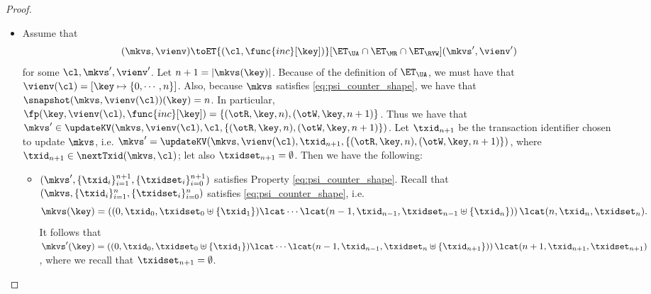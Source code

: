 \begin{proof}
\begin{itemize}
\item 
Assume that
\[
(\mkvs, \vienv) \toET{(\cl, \func{inc}[\key])}[\ET_{\UA} \cap \ET_{\MR} \cap  \ET_{\RYW}] (\mkvs', \vienv')
\]
for some $\cl, \mkvs', \vienv'$. Let $n+1 = \lvert \mkvs(\key) \rvert$. Because of the definition of 
$\ET_{\UA}$, we must have that $\vienv(\cl) = [\key \mapsto \{0, \cdots, n\}]$. Also, 
because $\mkvs$ satisfies \eqref{eq:psi_counter_shape}, we have that $\snapshot(\mkvs, \vienv(\cl))(\key) = n$. 
In particular, $\fp(\key, \vienv(\cl), \func{inc}[\key]) = \{(\otR, \key, n), (\otW, \key, n+1)\}$. 
Thus we have that $\mkvs' \in \updateKV(\mkvs, \vienv(\cl), \cl, \{(\otR, \key, n), (\otW, \key, n+1)\})$. 
Let $\txid_{n+1}$ be the transaction identifier 
chosen to update $\mkvs$, i.e. $\mkvs' = \updateKV(\mkvs, \vienv(\cl), \txid_{n+1}, \{(\otR, \key, n), (\otW, \key, n+1)\})$, 
where $\txid_{n+1} \in \nextTxid(\mkvs, \cl)$; 
let also $\txidset_{n+1} = \emptyset$. Then we have the following: 
\begin{itemize}
\item  $(\mkvs', \{\txid_{i}\}_{i=1}^{n+1}, \{\txidset_{i}\}_{i=0}^{n+1})$ satisfies Property \eqref{eq:psi_counter_shape}. 
Recall that $(\mkvs, \{\txid_{i}\}_{i=1}^{n}, \{\txidset_{i}\}_{i=0}^{n})$ satisfies \eqref{eq:psi_counter_shape}, 
i.e.
\[\mkvs(\key) = \left( (0, \txid_{0}, \txidset_{0} \uplus \{\txid_1\}) \lcat \cdots \lcat (n-1, \txid_{n-1}, \txidset_{n-1} \uplus \{\txid_{n}\}) \right) 
\lcat (n, \txid_{n}, \txidset_{n}).
\]
It follows that $\mkvs'(\key) = \left( (0, \txid_{0}, \txidset_{0} \uplus \{\txid_1\}) \lcat \cdots \lcat (n-1, \txid_{n-1}, \txidset_{n} \uplus \{\txid_{n+1}\}) \right) 
\lcat (n+1, \txid_{n+1}, \txidset_{n+1})$, 
where we recall that $\txidset_{n+1} = \emptyset$.


\end{itemize}
\end{itemize}
\end{proof}
